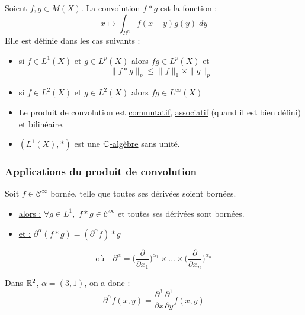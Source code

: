 \begin{theorem}
    Soient $f,g \in M(X)$. La convolution $f \ast g$ est la fonction :
        \[ x \longmapsto \int_{R^n} f(x-y) g(y) \; dy \] 
    Elle est définie dans les cas suivants :
    \begin{itemize}
        \item si $f \in L^1(X)$ et $g \in L^p(X)$ alors $fg \in L^p(X)$ et 
            \[ \| f \ast g\|_p \leq \|f\|_1 \times \|g\|_p \] 
        \item si $f \in L^2(X)$ et $g \in L^2(X)$ alors $fg \in L^\infty(X)$
    \end{itemize}
\end{theorem}

\begin{prop}
    \begin{itemize}
        \item Le produit de convolution est \underline{commutatif}, \underline{associatif} (quand il est bien défini) et bilinéaire.
        \item $(L^1(X),\ast)$ est une \underline{$\mathbb{C}$-algèbre} sans unité. 
    \end{itemize}
\end{prop}


\subsubsection{Applications du produit de convolution}

\begin{theorem}[Régularisation]
    Soit $f \in \mathcal{C}^\infty$ bornée, telle que toutes ses dérivées soient bornées. 

    \begin{itemize}
        \item[] \underline{alors :} \quad $ \forall g \in L^1, \; f \ast g \in \mathcal{C}^\infty$ et toutes ses dérivées sont bornées. 
        \item[] \underline{et :} \quad \quad $ \partial^\alpha (f \ast g) = (\partial^\alpha f) \ast g $
    \end{itemize}

    \[ \text{où} \quad \partial^\alpha = \Bigg( \frac{\partial}{\partial {x_1}} \Bigg)^{\alpha_1} \times \dots \times \Bigg( \frac{\partial}{\partial {x_n}} \Bigg)^{\alpha_n} \]
\end{theorem}

\begin{example}
    Dans $\mathbb{R}^2$, $\alpha = (3,1)$, on a donc :
        \[ \partial^\alpha f(x,y) = \frac{\partial^3}{\partial x} \frac{\partial^1}{\partial y} f(x,y) \] 
\end{example}


